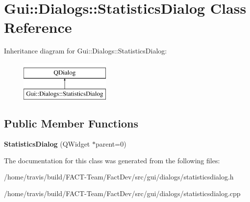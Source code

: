 \hypertarget{classGui_1_1Dialogs_1_1StatisticsDialog}{\section{Gui\-:\-:Dialogs\-:\-:Statistics\-Dialog Class Reference}
\label{classGui_1_1Dialogs_1_1StatisticsDialog}
}
Inheritance diagram for Gui\-:\-:Dialogs\-:\-:Statistics\-Dialog\-:\begin{figure}[H]
\begin{center}
\leavevmode
\includegraphics[height=2.000000cm]{d1/ddc/classGui_1_1Dialogs_1_1StatisticsDialog}
\end{center}
\end{figure}
\subsection*{Public Member Functions}
\begin{DoxyCompactItemize}
\item 
\hypertarget{classGui_1_1Dialogs_1_1StatisticsDialog_ac2a84b4fcf193327c1e2ef1403cc46ac}{{\bfseries Statistics\-Dialog} (Q\-Widget $\ast$parent=0)}\label{classGui_1_1Dialogs_1_1StatisticsDialog_ac2a84b4fcf193327c1e2ef1403cc46ac}

\end{DoxyCompactItemize}


The documentation for this class was generated from the following files\-:\begin{DoxyCompactItemize}
\item 
/home/travis/build/\-F\-A\-C\-T-\/\-Team/\-Fact\-Dev/src/gui/dialogs/statisticsdialog.\-h\item 
/home/travis/build/\-F\-A\-C\-T-\/\-Team/\-Fact\-Dev/src/gui/dialogs/statisticsdialog.\-cpp\end{DoxyCompactItemize}
